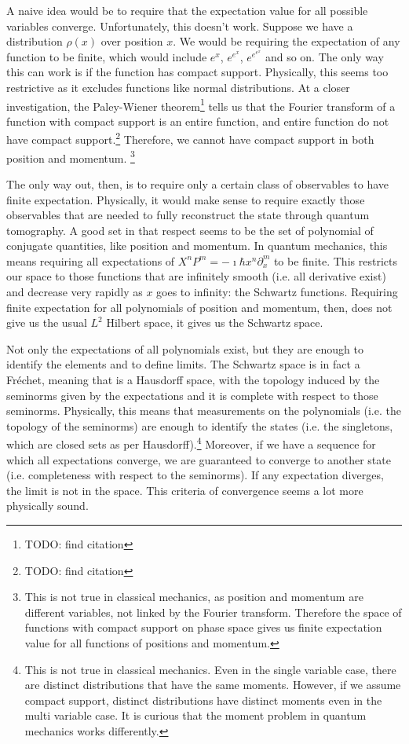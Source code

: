 \documentclass[10pt,twocolumn, nofootinbib]{revtex4-2}
\begin{document}
A naive idea would be to require that the expectation value for all possible variables converge. Unfortunately, this doesn't work. Suppose we have a distribution $\rho(x)$ over position $x$. We would be requiring the expectation of any function to be finite, which would include $e^x$, $e^{e^x}$, $e^{e^{e^x}}$ and so on. The only way this can work is if the function has compact support. Physically, this seems too restrictive as it excludes functions like normal distributions. At a closer investigation, the Paley-Wiener theorem\footnote{TODO: find citation} tells us that the Fourier transform of a function with compact support is an entire function, and entire function do not have compact support.\footnote{TODO: find citation} Therefore, we cannot have compact support in both position and momentum. \footnote{This is not true in classical mechanics, as position and momentum are different variables, not linked by the Fourier transform. Therefore the space of functions with compact support on phase space gives us finite expectation value for all functions of positions and momentum.}

The only way out, then, is to require only a certain class of observables to have finite expectation. Physically, it would make sense to require exactly those observables that are needed to fully reconstruct the state through quantum tomography. A good set in that respect seems to be the set of polynomial of conjugate quantities, like position and momentum. In quantum mechanics, this means requiring all expectations of $X^nP^m = -\imath \hbar x^n\partial_x ^m$ to be finite. This restricts our space to those functions that are infinitely smooth (i.e. all derivative exist) and decrease very rapidly as $x$ goes to infinity: the Schwartz functions. Requiring finite expectation for all polynomials of position and momentum, then, does not give us the usual $L^2$ Hilbert space, it gives us the Schwartz space.

Not only the expectations of all polynomials exist, but they are enough to identify the elements and to define limits. The Schwartz space is in fact a Fr\'echet, meaning that is a Hausdorff space, with the topology induced by the seminorms given by the expectations and it is complete with respect to those seminorms. Physically, this means that measurements on the polynomials (i.e. the topology of the seminorms) are enough to identify the states (i.e. the singletons, which are closed sets as per Hausdorff).\footnote{This is not true in classical mechanics. Even in the single variable case, there are distinct distributions that have the same moments. However, if we assume compact support, distinct distributions have distinct moments even in the multi variable case.\cite{moment_problem_2017} It is curious that the moment problem in quantum mechanics works differently.} Moreover, if we have a sequence for which all expectations converge, we are guaranteed to converge to another state (i.e. completeness with respect to the seminorms). If any expectation diverges, the limit is not in the space. This criteria of convergence seems a lot more physically sound.
\end{document}
